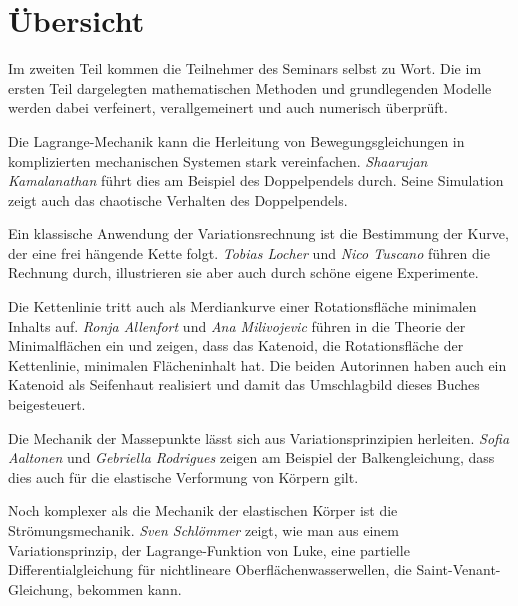 %
%
%
\chapter*{Übersicht}
\fancyhead[RE]{}
\label{buch:uebersicht}
Im zweiten Teil kommen die Teilnehmer des Seminars selbst zu Wort.
Die im ersten Teil dargelegten mathematischen Methoden und
grundlegenden Modelle werden dabei verfeinert, verallgemeinert
und auch numerisch überprüft.

Die Lagrange-Mechanik kann die Herleitung von Bewegungsgleichungen
in komplizierten mechanischen Systemen stark vereinfachen.
\textit{Shaarujan Kamalanathan} führt dies am Beispiel des
Doppelpendels durch.
Seine Simulation zeigt auch das chaotische Verhalten des Doppelpendels.

Ein klassische Anwendung der Variationsrechnung ist die Bestimmung
der Kurve, der eine frei hängende Kette folgt.
\textit{Tobias Locher} und \textit{Nico Tuscano}
führen die Rechnung durch, illustrieren sie aber auch durch schöne
eigene Experimente.

Die Kettenlinie tritt auch als Merdiankurve einer Rotationsfläche
minimalen Inhalts auf.
\textit{Ronja Allenfort} und \textit{Ana Milivojevic} führen in die
Theorie der Minimalflächen ein und zeigen, dass das Katenoid,
die Rotationsfläche der Kettenlinie, minimalen Flächeninhalt hat.
Die beiden Autorinnen haben auch ein Katenoid als Seifenhaut
realisiert und damit das Umschlagbild dieses Buches beigesteuert.

Die Mechanik der Massepunkte lässt sich aus Variationsprinzipien
herleiten.
\textit{Sofia Aaltonen} und \textit{Gebriella Rodrigues} zeigen
am Beispiel der Balkengleichung, dass dies auch für die elastische 
Verformung von Körpern gilt.

Noch komplexer als die Mechanik der elastischen Körper ist die
Strömungsmechanik.
\textit{Sven Schlömmer} zeigt, wie man aus einem Variationsprinzip,
der Lagrange-Funktion von Luke, eine partielle Differentialgleichung
für nichtlineare Oberflächenwasserwellen, die Saint-Venant-Gleichung,
bekommen kann.

